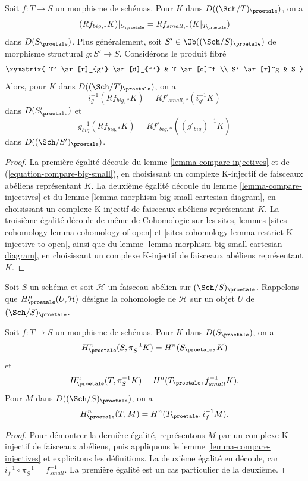 \begin{lemma}
\label{lemma-compare-higher-direct-image}
Soit $f : T \to S$ un morphisme de schémas.
Pour $K$ dans $D((\Sch/T)_\proetale)$, on a
$$
(Rf_{big, *}K)|_{S_\proetale} = Rf_{small, *}(K|_{T_\proetale})
$$
dans $D(S_\proetale)$. Plus généralement, soit $S' \in \Ob((\Sch/S)_\proetale)$
de morphisme structural $g : S' \to S$. Considérons le produit fibré
$$
\xymatrix{
T' \ar[r]_{g'} \ar[d]_{f'} & T \ar[d]^f \\
S' \ar[r]^g & S
}
$$
Alors, pour $K$ dans $D((\Sch/T)_\proetale)$, on a
$$
i_g^{-1}(Rf_{big, *}K) = Rf'_{small, *}(i_{g'}^{-1}K)
$$
dans $D(S'_\proetale)$ et
$$
g_{big}^{-1}(Rf_{big, *}K) = Rf'_{big, *}((g'_{big})^{-1}K)
$$
dans $D((\Sch/S')_\proetale)$.
\end{lemma}

\begin{proof}
La première égalité découle du lemme \ref{lemma-compare-injectives}
et de (\ref{equation-compare-big-small}),
en choisissant un complexe K-injectif de faisceaux abéliens représentant $K$.
La deuxième égalité découle du lemme \ref{lemma-compare-injectives}
et du lemme
\ref{lemma-morphism-big-small-cartesian-diagram},
en choisissant un complexe K-injectif de faisceaux abéliens représentant $K$.
La troisième égalité découle de même de
Cohomologie sur les sites, lemmes \ref{sites-cohomology-lemma-cohomology-of-open} et
\ref{sites-cohomology-lemma-restrict-K-injective-to-open},
ainsi que du lemme \ref{lemma-morphism-big-small-cartesian-diagram},
en choisissant un complexe K-injectif de faisceaux abéliens représentant $K$.
\end{proof}

\noindent
Soit $S$ un schéma et soit $\mathcal{H}$ un faisceau abélien sur
$(\Sch/S)_\proetale$. Rappelons que $H^n_\proetale(U, \mathcal{H})$ désigne
la cohomologie de $\mathcal{H}$ sur un objet $U$ de $(\Sch/S)_\proetale$.

\begin{lemma}
\label{lemma-compare-cohomology-big-small}
Soit $f : T \to S$ un morphisme de schémas. Pour $K$ dans $D(S_\proetale)$,
on a
$$
H^n_\proetale(S, \pi_S^{-1}K) = H^n(S_\proetale, K)
$$
et
$$
H^n_\proetale(T, \pi_S^{-1}K) = H^n(T_\proetale, f_{small}^{-1}K).
$$
Pour $M$ dans $D((\Sch/S)_\proetale)$, on a
$$
H^n_\proetale(T, M) = H^n(T_\proetale, i_f^{-1}M).
$$
\end{lemma}

\begin{proof}
Pour démontrer la dernière égalité, représentons $M$
par un complexe K-injectif de faisceaux abéliens,
puis appliquons le lemme \ref{lemma-compare-injectives}
et explicitons les définitions. La deuxième égalité en découle,
car $i_f^{-1} \circ \pi_S^{-1} = f_{small}^{-1}$. La première
égalité est un cas particulier
de la deuxième.
\end{proof}


